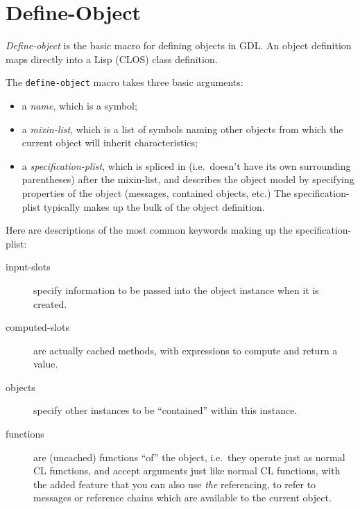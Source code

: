 \documentclass [11pt]{book}
\begin{document}
\section{Define-Object}

\label{sec:define-object}

\emph{Define-object} is the basic macro for defining objects in GDL. An object 
definition maps directly into a Lisp (CLOS) class definition. 

The \texttt{define-object} macro takes three basic arguments:

\begin{itemize}

\item a \emph{name}, which is a symbol;

\item a \emph{mixin-list}, which is a list of symbols naming other objects from which the current object 
will inherit characteristics;

\item a \emph{specification-plist}, which is spliced in (i.e.\ doesn't have its own surrounding 
parentheses) after the mixin-list, and describes
the object model by specifying properties of the object (messages, contained objects, etc.)
The specification-plist typically makes up the bulk of the object definition.

\end{itemize}



Here are descriptions of the most common keywords making up the specification-plist:

\begin{description}

\item [input-slots]
specify information to be passed into the object instance when it is created.

\item [computed-slots]
are actually cached methods, with expressions to compute and return a value.

\item [objects]
specify other instances to be ``contained'' within this instance.

\item [functions]
are (uncached) functions ``of'' the object, i.e.\ they
operate just as normal CL functions, and accept arguments just like
normal CL functions, with the added feature that you can also use \emph{the} referencing, to refer to messages or reference chains
	  which are available to the current object.

\end{description}
\end{document}
